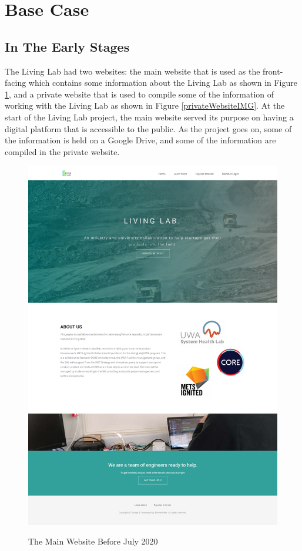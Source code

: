 \section{Base Case} \label{baseCase}

\subsection{In The Early Stages}
The Living Lab had two websites: the main website that is used as the front-facing which contains some information about the Living Lab as shown in Figure \ref{mainWebsiteIMG}, and a private website that is used to compile some of the information of working with the Living Lab as shown in Figure \ref{privateWebsiteIMG}. At the start of the Living Lab project, the main website served its purpose on having a digital platform that is accessible to the public. As the project goes on, some of the information is held on a Google Drive, and some of the information are compiled in the private website.

\begin{figure}
\begin{center}
  \includegraphics[width=\textwidth]{BaseCase/main-website-1.png} \\
  \caption{The Main Website Before July 2020} \label{mainWebsiteIMG}
\end{center}
\end{figure}

